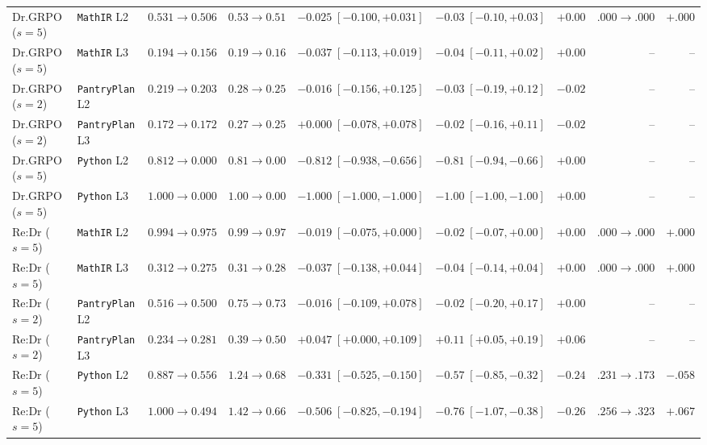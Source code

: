 \begin{table}[t]
{\begin{tabular}{llrrrrrrr}
Dr.GRPO ($s=5$) & \texttt{MathIR} L2 & $0.531\to0.506$ & $0.53\to0.51$ & $-0.025\;[-0.100,+0.031]$ & $-0.03\;[-0.10,+0.03]$ & $+0.00$ & $.000\to.000$ & $+.000$ \\
Dr.GRPO ($s=5$) & \texttt{MathIR} L3 & $0.194\to0.156$ & $0.19\to0.16$ & $-0.037\;[-0.113,+0.019]$ & $-0.04\;[-0.11,+0.02]$ & $+0.00$ & -- & -- \\
Dr.GRPO ($s=2$) & \texttt{PantryPlan} L2 & $0.219\to0.203$ & $0.28\to0.25$ & $-0.016\;[-0.156,+0.125]$ & $-0.03\;[-0.19,+0.12]$ & $-0.02$ & -- & -- \\
Dr.GRPO ($s=2$) & \texttt{PantryPlan} L3 & $0.172\to0.172$ & $0.27\to0.25$ & $+0.000\;[-0.078,+0.078]$ & $-0.02\;[-0.16,+0.11]$ & $-0.02$ & -- & -- \\
Dr.GRPO ($s=5$) & \texttt{Python} L2 & $0.812\to0.000$ & $0.81\to0.00$ & $-0.812\;[-0.938,-0.656]$ & $-0.81\;[-0.94,-0.66]$ & $+0.00$ & -- & -- \\
Dr.GRPO ($s=5$) & \texttt{Python} L3 & $1.000\to0.000$ & $1.00\to0.00$ & $-1.000\;[-1.000,-1.000]$ & $-1.00\;[-1.00,-1.00]$ & $+0.00$ & -- & -- \\
Re:Dr ($s=5$) & \texttt{MathIR} L2 & $0.994\to0.975$ & $0.99\to0.97$ & $-0.019\;[-0.075,+0.000]$ & $-0.02\;[-0.07,+0.00]$ & $+0.00$ & $.000\to.000$ & $+.000$ \\
Re:Dr ($s=5$) & \texttt{MathIR} L3 & $0.312\to0.275$ & $0.31\to0.28$ & $-0.037\;[-0.138,+0.044]$ & $-0.04\;[-0.14,+0.04]$ & $+0.00$ & $.000\to.000$ & $+.000$ \\
Re:Dr ($s=2$) & \texttt{PantryPlan} L2 & $0.516\to0.500$ & $0.75\to0.73$ & $-0.016\;[-0.109,+0.078]$ & $-0.02\;[-0.20,+0.17]$ & $+0.00$ & -- & -- \\
Re:Dr ($s=2$) & \texttt{PantryPlan} L3 & $0.234\to0.281$ & $0.39\to0.50$ & $+0.047\;[+0.000,+0.109]$ & $+0.11\;[+0.05,+0.19]$ & $+0.06$ & -- & -- \\
Re:Dr ($s=5$) & \texttt{Python} L2 & $0.887\to0.556$ & $1.24\to0.68$ & $-0.331\;[-0.525,-0.150]$ & $-0.57\;[-0.85,-0.32]$ & $-0.24$ & $.231\to.173$ & $-.058$ \\
Re:Dr ($s=5$) & \texttt{Python} L3 & $1.000\to0.494$ & $1.42\to0.66$ & $-0.506\;[-0.825,-0.194]$ & $-0.76\;[-1.07,-0.38]$ & $-0.26$ & $.256\to.323$ & $+.067$ \\
\bottomrule
\end{tabular}}
\end{table}


